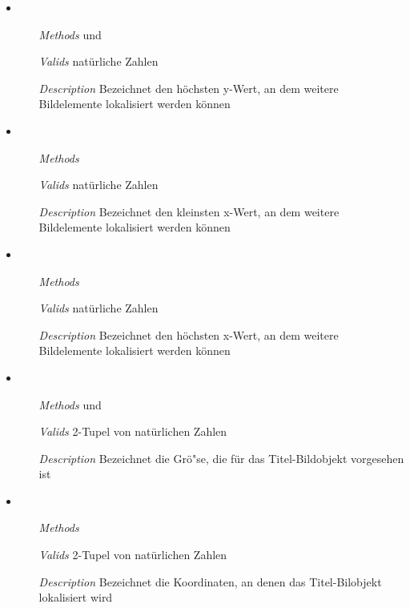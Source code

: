 \begin{description}
\begin{itemize}
\item {}
\begin{enumerate}
\item[\textit{Methods}]  und
\item[\textit{Valids}] nat\"urliche Zahlen
\item[\textit{Description}] Bezeichnet den h\"ochsten y-Wert, an dem
  weitere Bildelemente lokalisiert werden k\"onnen
\end{enumerate}

\item {}
\begin{enumerate}
\item[\textit{Methods}] 
\item[\textit{Valids}] nat\"urliche Zahlen
\item[\textit{Description}] Bezeichnet den kleinsten x-Wert, an dem
  weitere Bildelemente lokalisiert werden k\"onnen
\end{enumerate}

\item {}
\begin{enumerate}
\item[\textit{Methods}] 
\item[\textit{Valids}] nat\"urliche Zahlen
\item[\textit{Description}] Bezeichnet den h\"ochsten x-Wert, an dem
  weitere Bildelemente lokalisiert werden k\"onnen
\end{enumerate}

\item {}
\begin{enumerate}
\item[\textit{Methods}]  und
\item[\textit{Valids}] 2-Tupel von nat\"urlichen Zahlen
\item[\textit{Description}] Bezeichnet die Gr\"o"se, die f\"ur das
  Titel-Bildobjekt vorgesehen ist
\end{enumerate}

\item {}
\begin{enumerate}
\item[\textit{Methods}] 
\item[\textit{Valids}] 2-Tupel von nat\"urlichen Zahlen
\item[\textit{Description}] Bezeichnet die Koordinaten, an denen das
  Titel-Bilobjekt lokalisiert wird
\end{enumerate}


\end{itemize}
\end{description}
